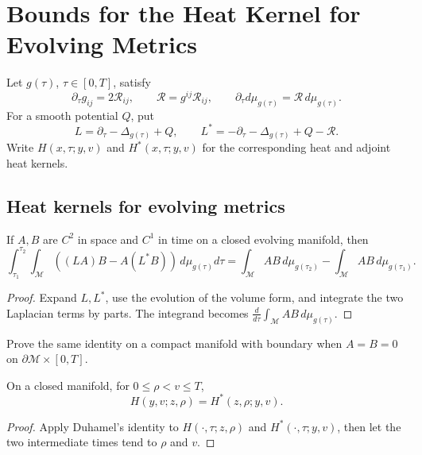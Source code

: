 \chapter{Bounds for the Heat Kernel for Evolving Metrics}
\label{ch:chow-iii-heat-kernel-bounds-evolving-metrics}

Let \(g(\tau)\), \(\tau\in[0,T]\), satisfy
\[
 \partial_\tau g_{ij}=2\mathcal R_{ij},\qquad
 \mathcal R=g^{ij}\mathcal R_{ij},\qquad
 \partial_\tau d\mu_{g(\tau)}=\mathcal R\,d\mu_{g(\tau)}.
\]
For a smooth potential \(Q\), put
\[
 L=\partial_\tau-\Delta_{g(\tau)}+Q,
 \qquad L^*=-\partial_\tau-\Delta_{g(\tau)}+Q-\mathcal R.
\]
Write \(H(x,\tau;y,v)\) and \(H^*(x,\tau;y,v)\) for the corresponding
heat and adjoint heat kernels.

\section{Heat kernels for evolving metrics}

\begin{lemma}
\label{lem:chow-iii-duhamel-evolving-closed}
If \(A,B\) are \(C^2\) in space and \(C^1\) in time on a closed
evolving manifold, then
\[
 \int_{\tau_1}^{\tau_2}\!\int_{\mathcal M}
 ((LA)B-A(L^*B))\,d\mu_{g(\tau)}d\tau
 =\int_{\mathcal M}AB\,d\mu_{g(\tau_2)}
  -\int_{\mathcal M}AB\,d\mu_{g(\tau_1)}.
\]
\end{lemma}
\begin{proof}
Expand \(L,L^*\), use the evolution of the volume form, and integrate the
two Laplacian terms by parts.  The integrand becomes
\(\frac d{d\tau}\int_{\mathcal M}AB\,d\mu_{g(\tau)}\).
\end{proof}

\begin{claim}
\label{clm:chow-iii-duhamel-dirichlet-exercise}
Prove the same identity on a compact manifold with boundary when
\(A=B=0\) on \(\partial\mathcal M\times[0,T]\).
\end{claim}

\begin{lemma}
\label{lem:chow-iii-heat-adjoint-kernel-symmetry-closed}
On a closed manifold, for \(0\le \rho<v\le T\),
\[
 H(y,v;z,\rho)=H^*(z,\rho;y,v).
\]
\end{lemma}
\begin{proof}
Apply Duhamel's identity to \(H(\cdot,\tau;z,\rho)\) and
\(H^*(\cdot,\tau;y,v)\), then let the two intermediate times tend to
\(\rho\) and \(v\).
\end{proof}

